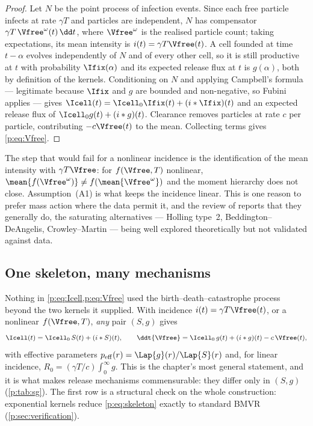 \begin{proof}
Let $N$ be the point process of infection events. Since each free particle
infects at rate $\gamma T$ and particles are independent, $N$ has
compensator $\gamma T\,\Vfree^{\omega}(t)\,\dd t$, where $\Vfree^\omega$ is
the realised particle count; taking expectations, its mean intensity is
$i(t)=\gamma T\Vfree(t)$. A cell founded at time $t-\alpha$ evolves
independently of $N$ and of every other cell, so it is still productive at
$t$ with probability $\Ifix(\alpha)$ and its expected release flux at $t$ is
$g(\alpha)$, both by definition of the kernels. Conditioning on $N$ and
applying Campbell's formula --- legitimate because $\Ifix$ and $g$ are
bounded and non-negative, so Fubini applies --- gives
$\Icell(t)=\Icell_0\Ifix(t)+(i*\Ifix)(t)$ and an expected release flux of
$\Icell_0g(t)+(i*g)(t)$. Clearance removes particles at rate $c$ per
particle, contributing $-c\Vfree(t)$ to the mean. Collecting terms gives
\cref{p:eq:Vfree}.
\end{proof}

\noindent
The step that would fail for a nonlinear incidence is the identification of
the mean intensity with $\gamma T\Vfree$: for $f(\Vfree,T)$ nonlinear,
$\mean{f(\Vfree^\omega)}\neq f(\mean{\Vfree^\omega})$ and the moment
hierarchy does not close. Assumption~(A1) is what keeps the incidence
linear. This is one reason to prefer mass action where the data permit it,
and the review of \cite{ciupe2024incorporating} reports that they generally
do, the saturating alternatives --- Holling type~2, Beddington--DeAngelis,
Crowley--Martin --- being well explored theoretically but not validated
against data.

\subsection{One skeleton, many mechanisms}
\label{p:sec:generality}

Nothing in \cref{p:eq:Icell,p:eq:Vfree} used the birth--death--catastrophe
process beyond the two kernels it supplied. With incidence
$i(t)=\gamma T\Vfree(t)$, or a nonlinear $f(\Vfree,T)$, \emph{any} pair
$(S,g)$ gives
\begin{equation}
\Icell(t)=\Icell_0\,S(t)+(i*S)(t),
\qquad
\ddt{\Vfree}=\Icell_0\,g(t)+(i*g)(t)-c\,\Vfree(t),
\label{p:eq:skeleton}
\end{equation}
with effective parameters $p_{\rm eff}(r)=\Lap{g}(r)/\Lap{S}(r)$ and, for
linear incidence, $R_0=(\gamma T/c)\int_0^\infty g$. This is the chapter's
most general statement, and it is what makes release mechanisms
commensurable: they differ only in $(S,g)$ (\cref{p:tab:sg}). The first row
is a structural check on the whole construction: exponential kernels reduce
\cref{p:eq:skeleton} exactly to standard BMVR
(\cref{p:sec:verification}).

